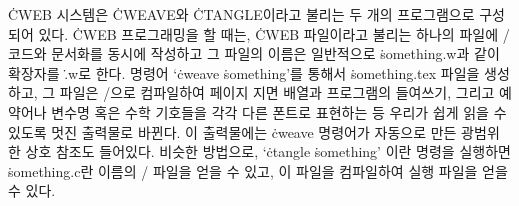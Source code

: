 \.{CWEB} 시스템은 \.{CWEAVE}와 \.{CTANGLE}이라고 불리는 두 개의 프로그램으로 구성되어
있다. \.{CWEB} 프로그래밍을 할 때는, \.{CWEB} 파일이라고 불리는 하나의 파일에 \CEE/ 코드와
문서화를 동시에 작성하고 그 파일의 이름은 일반적으로 \.{something.w}과 같이 확장자를
\.{.w}로 한다. 명령어 `\.{cweave} \.{something}'를 통해서 \.{something.tex} 파일을
생성하고, 그 파일은 \TEX/으로 컴파일하여 페이지 지면 배열과 프로그램의 들여쓰기, 그리고
예약어나 변수명 혹은 수학 기호들을 각각 다른 폰트로 표현하는 등 우리가 쉽게 읽을 수 있도록
멋진 출력물로 바뀐다. 이 출력물에는 \.{cweave} 명령어가 자동으로 만든 광범위한 상호 참조도
들어있다. 비슷한 방법으로, `\.{ctangle} \.{something}' 이란 명령을 실행하면
\.{something.c}란  이름의 \CEE/ 파일을 얻을 수 있고, 이 파일을 컴파일하여 실행 파일을
얻을 수 있다.

